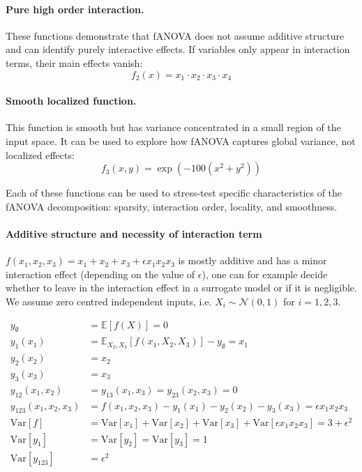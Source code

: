 \paragraph{Pure high order interaction.}
These functions demonstrate that fANOVA does not assume additive structure and can identify purely interactive effects. If variables only appear in interaction terms, their main effects vanish:
\[
f_2(x) = x_1 \cdot x_2 \cdot x_3 \cdot x_4
\]

\paragraph{Smooth localized function.}
This function is smooth but has variance concentrated in a small region of the input space. It can be used to explore how fANOVA captures global variance, not localized effects:
\[
f_3(x, y) = \exp\left(-100(x^2 + y^2)\right)
\]

Each of these functions can be used to stress-test specific characteristics of the fANOVA decomposition: sparsity, interaction order, locality, and smoothness.

\paragraph{Additive structure and necessity of interaction term}
$f(x_1, x_2, x_3) = x_1 + x_2 + x_3 + \epsilon x_1 x_2 x_3$ is mostly additive and has a minor interaction effect (depending on the value of $\epsilon$), one can for example decide whether to leave in the interaction effect in a surrogate model or if it is negligible.
We assume zero centred independent inputs, i.e. $X_i \sim \mathcal{N}(0, 1)$ for $i = 1, 2, 3$.

\begin{align*}
y_\emptyset &= \mathbb{E}[f(X)] = 0 \\
y_1(x_1) &= \mathbb{E}_{X_2, X_3}[f(x_1, X_2, X_3)] - y_\emptyset = x_1 \\
y_2(x_2) &= x_2 \\
y_3(x_3) &= x_3 \\
y_{12}(x_1, x_2) &= y_{13}(x_1, x_3) = y_{23}(x_2, x_3) = 0 \\
y_{123}(x_1, x_2, x_3) &= f(x_1, x_2, x_3) - y_1(x_1) - y_2(x_2) - y_3(x_3) = \epsilon x_1 x_2 x_3 \\
\mathrm{Var}[f] &= \mathrm{Var}[x_1] + \mathrm{Var}[x_2] + \mathrm{Var}[x_3] + \mathrm{Var}[\epsilon x_1 x_2 x_3] = 3 + \epsilon^2 \\
\mathrm{Var}[y_1] &= \mathrm{Var}[y_2] = \mathrm{Var}[y_3] = 1 \\
\mathrm{Var}[y_{123}] &= \epsilon^2
\end{align*}


